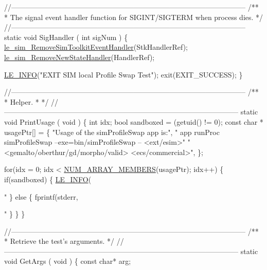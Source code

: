 \begin{DoxyCodeInclude}
{{{{{{{{{{{{{{\textcolor{comment}{//--------------------------------------------------------------------------------------------------}\textcolor{comment}{}
\textcolor{comment}{/**}
\textcolor{comment}{ * The signal event handler function for SIGINT/SIGTERM when process dies.}
\textcolor{comment}{ */}
\textcolor{comment}{//--------------------------------------------------------------------------------------------------}
\textcolor{keyword}{static} \textcolor{keywordtype}{void} SigHandler
(
    \textcolor{keywordtype}{int} sigNum
)
\{
    \hyperlink{le__sim__interface_8h_a2485840533f80632a61096b1d7c5d8f2}{le\_sim\_RemoveSimToolkitEventHandler}(StkHandlerRef);
    \hyperlink{le__sim__interface_8h_a0286578e9aa46ba864df1878263b9f84}{le\_sim\_RemoveNewStateHandler}(HandlerRef);

    \hyperlink{le__log_8h_a23e6d206faa64f612045d688cdde5808}{LE\_INFO}(\textcolor{stringliteral}{"EXIT SIM local Profile Swap Test"});
    exit(EXIT\_SUCCESS);
\}

\textcolor{comment}{//--------------------------------------------------------------------------------------------------}\textcolor{comment}{}
\textcolor{comment}{/**}
\textcolor{comment}{ * Helper.}
\textcolor{comment}{ *}
\textcolor{comment}{ */}
\textcolor{comment}{//--------------------------------------------------------------------------------------------------}
\textcolor{keyword}{static} \textcolor{keywordtype}{void} PrintUsage
(
    \textcolor{keywordtype}{void}
)
\{
    \textcolor{keywordtype}{int} idx;
    \textcolor{keywordtype}{bool} sandboxed = (getuid() != 0);
    \textcolor{keyword}{const} \textcolor{keywordtype}{char} * usagePtr[] =
    \{
            \textcolor{stringliteral}{"Usage of the simProfileSwap app is:"},
            \textcolor{stringliteral}{"   app runProc simProfileSwap --exe=bin/simProfileSwap -- <ext/esim>"}
              \textcolor{stringliteral}{" <gemalto/oberthur/gd/morpho/valid> <ecs/commercial>"},
    \};

    \textcolor{keywordflow}{for}(idx = 0; idx < \hyperlink{le__basics_8h_a8d8f28a045f43b477cafb67a99894c07}{NUM\_ARRAY\_MEMBERS}(usagePtr); idx++)
    \{
        \textcolor{keywordflow}{if}(sandboxed)
        \{
            \hyperlink{le__log_8h_a23e6d206faa64f612045d688cdde5808}{LE\_INFO}(\textcolor{stringliteral}{"%
        \}
        \textcolor{keywordflow}{else}
        \{
            fprintf(stderr, \textcolor{stringliteral}{"%
        \}
    \}
\}

\textcolor{comment}{//--------------------------------------------------------------------------------------------------}\textcolor{comment}{}
\textcolor{comment}{/**}
\textcolor{comment}{ * Retrieve the test's arguments.}
\textcolor{comment}{ */}
\textcolor{comment}{//--------------------------------------------------------------------------------------------------}
\textcolor{keyword}{static} \textcolor{keywordtype}{void} GetArgs
(
    \textcolor{keywordtype}{void}
)
\{
    \textcolor{keyword}{const} \textcolor{keywordtype}{char}*  arg;

}}}}}}}}}}}}}}}}
\end{DoxyCodeInclude}
